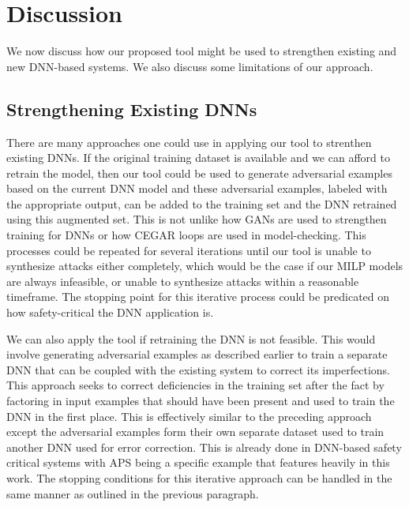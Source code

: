 \chapter{Discussion}
We now discuss how our proposed tool might be used to strengthen existing and new DNN-based systems. %
We also discuss some limitations of our approach.

\section{Strengthening Existing DNNs}
There are many approaches one could use in applying our tool to strenthen existing DNNs. If the original training dataset is available and we can afford to retrain the model, then our tool
could be used to generate adversarial examples based on the current DNN model and these adversarial examples, labeled with the appropriate output, can be added to the training set and the DNN
retrained using this augmented set. This is not unlike how GANs are used to strengthen training for DNNs or how CEGAR loops are used in model-checking. This processes could be repeated for several
iterations until our tool is unable to synthesize attacks either completely, which would be the case if our MILP models are always infeasible, or unable to synthesize attacks within a reasonable timeframe.
The stopping point for this iterative process could be predicated on how safety-critical the DNN application is.

We can also apply the tool if retraining the DNN is not feasible. This would involve generating adversarial examples as described earlier to train a separate DNN that can be coupled
with the existing system to correct its imperfections. This approach seeks to correct deficiencies in the training set after the fact by factoring in input examples that should have been present
and used to train the DNN in the first place. This is effectively similar to the preceding approach except the adversarial examples form their own separate dataset used to train another DNN used for
error correction. This is already done in DNN-based safety critical systems with APS being a specific example that features heavily in this work. The stopping conditions for this iterative approach
can be handled in the same manner as outlined in the previous paragraph.

